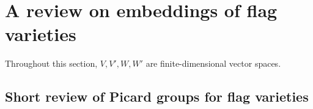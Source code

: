 \documentclass[12pt]{amsart}
\newcommand{\Flags}{\mathrm{Fl}}
\newcommand{\Grass}{\mathrm{Gr}}
\newcommand{\OFlags}{\mathrm{FlO}}
\newcommand{\OGrass}{\mathrm{GrO}}
\newcommand{\SFlags}{\mathrm{FlS}}
\newcommand{\SGrass}{\mathrm{GrS}}
\newtheorem{theorem}{Theorem}[section]
\theoremstyle{definition}
\newtheorem{remark}[theorem]{Remark}
\begin{document}








\section{A review on embeddings of flag varieties}

\label{section-3}

Throughout this section, $V,V',W,W'$ are finite-dimensional vector spaces.



\subsection{Short review of Picard groups for flag varieties}
\end{document}
